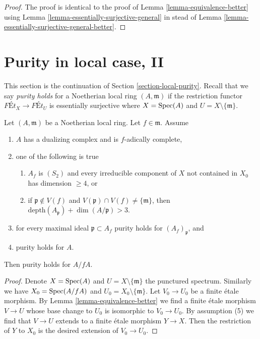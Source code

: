 \begin{proof}
The proof is identical to the proof of
Lemma \ref{lemma-equivalence-better}
using
Lemma \ref{lemma-essentially-surjective-general}
in stead of
Lemma \ref{lemma-essentially-surjective-general-better}.
\end{proof}



\section{Purity in local case, II}
\label{section-local-purity-II}

\noindent
This section is the continuation of Section \ref{section-local-purity}.
Recall that we say {\it purity holds} for a Noetherian local ring
$(A, \mathfrak m)$ if the restriction functor
$\textit{F\'Et}_X \to \textit{F\'Et}_U$ is essentially
surjective where $X = \mathop{\mathrm{Spec}}(A)$ and $U = X \setminus \{\mathfrak m\}$.

\begin{lemma}
\label{lemma-purity-inherited-by-hypersurface-better}
Let $(A, \mathfrak m)$ be a Noetherian local ring.
Let $f \in \mathfrak m$. Assume
\begin{enumerate}
\item $A$ has a dualizing complex and is $f$-adically complete,
\item one of the following is true
\begin{enumerate}
\item $A_f$ is $(S_2)$ and every irreducible component of $X$
not contained in $X_0$ has dimension $\geq 4$, or
\item if $\mathfrak p \not \in V(f)$ and
$V(\mathfrak p) \cap V(f) \not = \{\mathfrak m\}$, then
$\text{depth}(A_\mathfrak p) + \dim(A/\mathfrak p) > 3$.
\end{enumerate}
\item for every maximal ideal $\mathfrak p \subset A_f$
purity holds for $(A_f)_\mathfrak p$, and
\item purity holds for $A$.
\end{enumerate}
Then purity holds for $A/fA$.
\end{lemma}

\begin{proof}
Denote $X = \mathop{\mathrm{Spec}}(A)$ and $U = X \setminus \{\mathfrak m\}$
the punctured spectrum. Similarly we have $X_0 = \mathop{\mathrm{Spec}}(A/fA)$
and $U_0 = X_0 \setminus \{\mathfrak m\}$.
Let $V_0 \to U_0$ be a finite \'etale morphism. By
Lemma \ref{lemma-equivalence-better}
we find a finite \'etale morphism $V \to U$
whose base change to $U_0$
is isomorphic to $V_0 \to U_0$.
By assumption (5) we find that $V \to U$ extends
to a finite \'etale morphism $Y \to X$. Then the restriction of
$Y$ to $X_0$ is the desired extension of $V_0 \to U_0$.
\end{proof}

